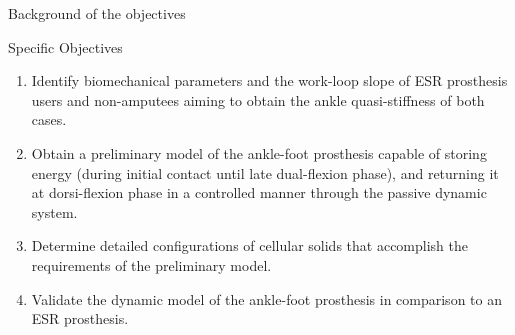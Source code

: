 \documentclass[10pt]{beamer}
\begin{document}
\begin{frame}[fragile]{Background of the objectives}

\begin{alertblock}{Specific Objectives}
\begin{enumerate}

\item Identify biomechanical parameters and the work-loop slope of ESR prosthesis users and non-amputees aiming to obtain the ankle quasi-stiffness of both cases.

\item Obtain a preliminary model of the ankle-foot prosthesis capable of storing energy (during initial contact until late dual-flexion phase), and returning it at dorsi-flexion phase in a controlled manner through the passive dynamic system.

\item Determine detailed configurations of cellular solids that accomplish the requirements of the preliminary model.
\item Validate the dynamic model of the ankle-foot prosthesis in comparison to an ESR prosthesis. \end{enumerate}

\end{alertblock}
\end{frame}
\end{document}
